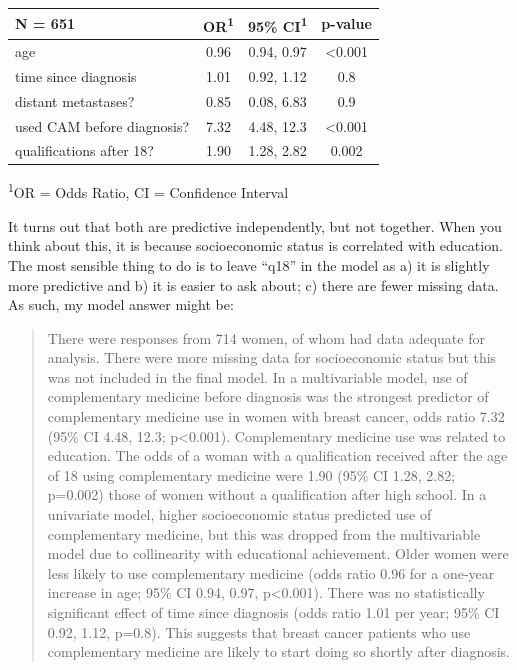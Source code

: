 \documentclass[]{book}
\begin{document}
\captionsetup[table]{labelformat=empty,skip=1pt}
\begin{longtable}{lccc}
\toprule
\textbf{N = 651} & \textbf{OR}\textsuperscript{1} & \textbf{95\% CI}\textsuperscript{1} & \textbf{p-value} \\ 
\midrule
age & 0.96 & 0.94, 0.97 & <0.001 \\ 
time since diagnosis & 1.01 & 0.92, 1.12 & 0.8 \\ 
distant metastases? & 0.85 & 0.08, 6.83 & 0.9 \\ 
used CAM before diagnosis? & 7.32 & 4.48, 12.3 & <0.001 \\ 
qualifications after 18? & 1.90 & 1.28, 2.82 & 0.002 \\ 
\bottomrule
\end{longtable}
\vspace{-5mm}
\begin{minipage}{\linewidth}
\textsuperscript{1}OR = Odds Ratio, CI = Confidence Interval \\ 
\end{minipage}

It turns out that both are predictive independently, but not together. When you think about this, it is because socioeconomic status is correlated with education. The most sensible thing to do is to leave ``q18'' in the model as a) it is slightly more predictive and b) it is easier to ask about; c) there are fewer missing data. As such, my model answer might be:

\begin{quote}
There were responses from 714 women, of whom had data adequate for analysis. There were more missing data for socioeconomic status but this was not included in the final model. In a multivariable model, use of complementary medicine before diagnosis was the strongest predictor of complementary medicine use in women with breast cancer, odds ratio 7.32 (95\% CI 4.48, 12.3; p\textless0.001). Complementary medicine use was related to education. The odds of a woman with a qualification received after the age of 18 using complementary medicine were 1.90 (95\% CI 1.28, 2.82; p=0.002) those of women without a qualification after high school. In a univariate model, higher socioeconomic status predicted use of complementary medicine, but this was dropped from the multivariable model due to collinearity with educational achievement. Older women were less likely to use complementary medicine (odds ratio 0.96 for a one-year increase in age; 95\% CI 0.94, 0.97, p\textless0.001). There was no statistically significant effect of time since diagnosis (odds ratio 1.01 per year; 95\% CI 0.92, 1.12, p=0.8). This suggests that breast cancer patients who use complementary medicine are likely to start doing so shortly after diagnosis.
\end{quote}
\end{document}
